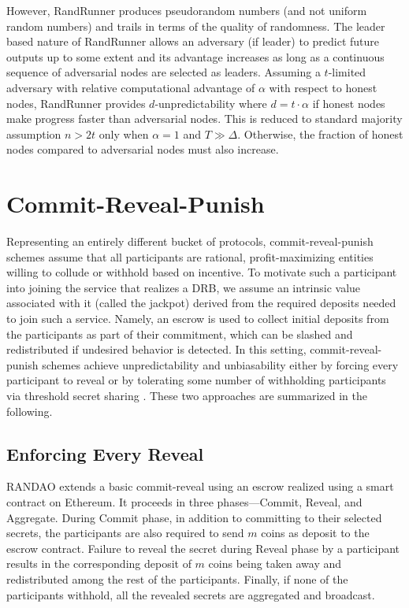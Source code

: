 \documentclass[letterpaper,twocolumn,10pt]{article}
\theoremstyle{definition}
\theoremstyle{remark}
\begin{document}
However, RandRunner produces pseudorandom numbers (and not uniform random numbers) and trails in terms of the quality of randomness. The leader based nature of RandRunner allows an adversary (if leader) to predict future outputs up to some extent and its advantage increases as long as a continuous sequence of adversarial nodes are selected as leaders. Assuming a $t$-limited adversary with relative computational advantage of $\alpha$ with respect to honest nodes, RandRunner provides $d$-unpredictability where $d = t \cdot \alpha$ if honest nodes make progress faster than adversarial nodes. This is reduced to standard majority assumption $n > 2t$ only when $\alpha = 1$ and $T \gg \Delta$. Otherwise, the fraction of honest nodes compared to adversarial nodes must also increase.
\section{Commit-Reveal-Punish}
\label{section:commit-reveal-punish}
Representing an entirely different bucket of protocols, commit-reveal-punish schemes assume that all participants are rational, profit-maximizing entities willing to collude or withhold based on incentive. To motivate such a participant into joining the service that realizes a DRB, we assume an intrinsic value associated with it (called the jackpot) derived from the required deposits needed to join such a service. Namely, an escrow is used to collect initial deposits from the participants as part of their commitment, which can be slashed and redistributed if undesired behavior is detected. In this setting, commit-reveal-punish schemes achieve unpredictability and unbiasability either by forcing every participant to reveal \cite{youcai2017randao, andrychowicz2014secure, bentov2014use} or by tolerating some number of withholding participants via threshold secret sharing \cite{david2020economically}. These two approaches are summarized in the following.

\subsection{Enforcing Every Reveal}
RANDAO \cite{youcai2017randao} extends a basic commit-reveal using an escrow realized using a smart contract on Ethereum. It proceeds in three phases---Commit, Reveal, and Aggregate. During Commit phase, in addition to committing to their selected secrets, the participants are also required to send $m$ coins as deposit to the escrow contract. Failure to reveal the secret during Reveal phase by a participant results in the corresponding deposit of $m$ coins being taken away and redistributed among the rest of the participants. Finally, if none of the participants withhold, all the revealed secrets are aggregated and broadcast.
\end{document}
